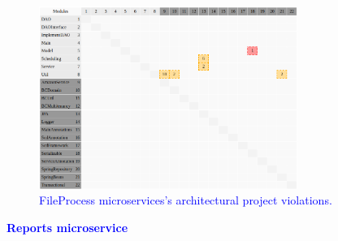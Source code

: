 \documentclass[12pt]{article}
\begin{document}
\begin{figure}[ht]
\centering
\includegraphics[width=0.75\textwidth]{figuras/violacoesFileProccess.png}
\caption{\textcolor{blue}{FileProcess microservices's architectural project violations.}}
\label{fig:microservices}
\end{figure}


\noindent\textbf{\large{\textcolor{blue}{Reports microservice}}}
\label{sec:ApendiceReports}
\end{document}
